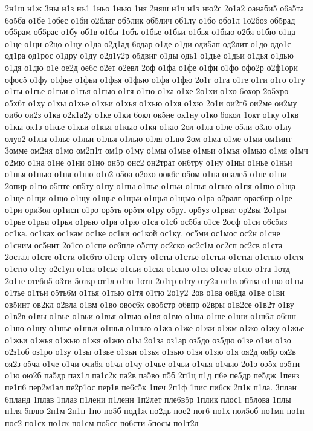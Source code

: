 {2н1ш
н1ж
3ны
н1з
нъ1
1ньо
1нью
1ня
2няш
н1ч
н1э
ню2с
2о1а2
оанаби5
о6а5та
6о5ба
о1бе
1обес
о1би
о2благ
об5лик
об5лич
об1лу
о1бо
обо1л
1о2боз
об5рад
об5рам
об5рас
о1бу
об1в
о1бы
1объ
о1бье
о1бьи
о1бья
о1бью
о2бя
о1бю
о1ца
о1це
о1ци
о2цо
о1цу
о1да
о2д1ад
6одар
о1де
о1ди
оди5ап
од2лит
о1до
одо1с
од1ра
од1рос
о1дру
о1ду
о2д1у2р
о5двиг
о1ды
одь1
о1дье
о1дьи
о1дья
о1дью
о1дя
о1дю
о1е
ое2д
ое6с
о2ет
о2евл
2оф
о1фа
о1фе
о1фи
о1фо
офо2р
о2ф1ори
офос5
о1фу
о1фье
о1фьи
о1фья
о1фью
о1фя
о1фю
2о1г
о1га
о1ге
о1ги
о1го
о1гу
о1гы
о1гье
о1гьи
о1гья
о1гью
о1гя
о1гю
о1ха
о1хе
2о1хи
о1хо
6охор
2о5хро
о5х6т
о1ху
о1хы
о1хье
о1хьи
о1хья
о1хью
о1хя
о1хю
2о1и
ои2г6
ои2ме
ои2му
ои6о
ои2з
о1ка
о2к1а2у
о1ке
о1ки
6окл
ок5не
ок1ну
о1ко
6окол
1окт
о1ку
о1кв
о1кы
ок1з
о1кье
о1кьи
о1кья
о1кью
о1кя
о1кю
2ол
о1ла
о1ле
о5ли
о3ло
о1лу
олуо2
о1лы
о1лье
о1льи
о1лья
о1лью
о1ля
о1лю
2ом
о1ма
о1ме
о1ми
ом1инт
3омме
ом2ня
о1мо
ом2п1т
ом1р
о1му
о1мы
о1мье
о1мьи
о1мья
о1мью
о1мя
о1мч
о2мю
о1на
о1не
о1ни
о1но
он5р
онс2
он2трат
он6тру
о1ну
о1ны
о1нье
о1ньи
о1нья
о1нью
о1ня
о1ню
о1о2
о5оа
о2охо
оок6с
о5ом
о1па
опале5
о1пе
о1пи
2опир
о1по
о5пте
оп5ту
о1пу
о1пы
о1пье
о1пьи
о1пья
о1пью
о1пя
о1пю
о1ща
о1ще
о1щи
о1що
о1щу
о1щье
о1щьи
о1щья
о1щью
о1ра
о2ралг
орас6пр
о1ре
о1ри
ори3ол
ор1исп
о1ро
ор5ть
ор5тя
о1ру
о5ру.
ор5уз
о1рват
ор2вы
2о1ры
о1рье
о1рьи
о1рья
о1рью
о1ря
о1рю
о1са
о1сб
ос5ба
о1се
2осф
о1си
о6с5из
ос1ка.
ос1ках
ос1кам
ос1ке
ос1ки
ос1кой
ос1ку.
ос5ми
ос1мос
ос2н
о1сне
о1сним
ос5нит
2о1со
о1спе
ос6пле
о5спу
ос2ско
ос2с1м
ос2сп
ос2св
о1ста
2остал
о1сте
о1сти
о1с6то
о1стр
о1сту
о1сты
о1стье
о1стьи
о1стья
о1стью
о1стя
о1стю
о1су
о2с1ун
о1сы
о1сье
о1сьи
о1сья
о1сью
о1ся
о1сче
о1сю
о1та
1отд
2о1те
оте6п5
о3ти
5откр
от1л
о1то
1отп
2о1тр
о1ту
оту2а
от1в
о6тва
о1тво
о1ты
о1тье
о1тьи
о5ть6м
о1тья
о1тью
о1тя
о1тю
2о1у2
2ов
о1ва
ов6да
о1ве
о1ви
ов5инт
ов2кл
о2вла
о1вм
о1во
овос6к
ово5стр
о6впр
о2вры
о1в2се
о1в2т
о1ву
о1в2в
о1вы
о1вье
о1вьи
о1вья
о1вью
о1вя
о1вю
о1ша
о1ше
о1ши
о1ш6л
о6шн
о1шо
о1шу
о1шье
о1шьи
о1шья
о1шью
о1жа
о1же
о1жи
о1жм
о1жо
о1жу
о1жье
о1жьи
о1жья
о1жью
о1жя
о1жю
о1ы
2о1за
оз1ар
оз5до
оз5дю
о1зе
о1зи
о1зо
о2з1об
оз1ро
о1зу
о1зы
о1зье
о1зьи
о1зья
о1зью
о1зя
о1зю
о1я
оя2д
оя6р
оя2в
оя2з
о5ча
о1че
о1чи
очи6я
о1чл
о1чу
о1чье
о1чьи
о1чья
о1чью
2о1э
оэ5х
оэ5ти
о1ю
ою2б
па5др
пах1л
па1с2к
па2в
па5во
п5б
2п1ц
п1д
п6е
пе5др
пе5дж
1пенз
пе1п6
пер2м1ал
пе2р1ос
пер1в
пе6с5к
1печ
2п1ф
1пис
пи6ск
2п1к
п1ла.
3план
6планд
1плав
1плаз
п1лени
п1ленн
1п2лет
пле6в5р
1плик
плос1
п5лова
1плы
п1ля
5плю
2п1м
2п1н
1по
по5б
под1ж
по2дь
пое2
пог6
по1х
пол5об
по1мн
по1п
пос2
по1сх
по1ск
по1см
по5сс
по6сти
5посы
по1т2л
}

